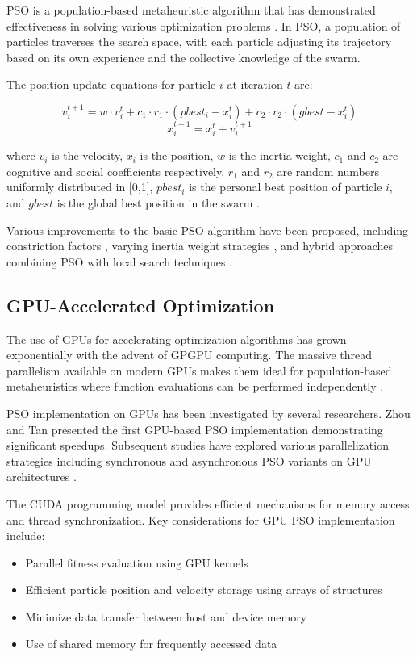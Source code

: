 \documentclass[conference]{IEEEtran}
\begin{document}
PSO is a population-based metaheuristic algorithm that has demonstrated effectiveness in solving various optimization problems \cite{poli2008analysis}. In PSO, a population of particles traverses the search space, with each particle adjusting its trajectory based on its own experience and the collective knowledge of the swarm.

The position update equations for particle $i$ at iteration $t$ are:

\begin{equation}
v_i^{t+1} = w \cdot v_i^{t} + c_1 \cdot r_1 \cdot (pbest_i - x_i^{t}) + c_2 \cdot r_2 \cdot (gbest - x_i^{t})
\end{equation}
\begin{equation}
x_i^{t+1} = x_i^{t} + v_i^{t+1}
\end{equation}

where $v_i$ is the velocity, $x_i$ is the position, $w$ is the inertia weight, $c_1$ and $c_2$ are cognitive and social coefficients respectively, $r_1$ and $r_2$ are random numbers uniformly distributed in [0,1], $pbest_i$ is the personal best position of particle $i$, and $gbest$ is the global best position in the swarm \cite{shi1998modified}.

Various improvements to the basic PSO algorithm have been proposed, including constriction factors \cite{clerc1999particle}, varying inertia weight strategies \cite{shi2001fuzzy}, and hybrid approaches combining PSO with local search techniques \cite{liang2006comprehensive}.

\subsection{GPU-Accelerated Optimization}

The use of GPUs for accelerating optimization algorithms has grown exponentially with the advent of GPGPU computing. The massive thread parallelism available on modern GPUs makes them ideal for population-based metaheuristics where function evaluations can be performed independently \cite{schuts2011gpu}.

PSO implementation on GPUs has been investigated by several researchers. Zhou and Tan \cite{zhou2009GPU} presented the first GPU-based PSO implementation demonstrating significant speedups. Subsequent studies have explored various parallelization strategies including synchronous and asynchronous PSO variants on GPU architectures \cite{richer2009gpu,masi2011implementing}.

The CUDA programming model provides efficient mechanisms for memory access and thread synchronization. Key considerations for GPU PSO implementation include:
\begin{itemize}
\item Parallel fitness evaluation using GPU kernels
\item Efficient particle position and velocity storage using arrays of structures
\item Minimize data transfer between host and device memory
\item Use of shared memory for frequently accessed data
\end{itemize}
\end{document}
